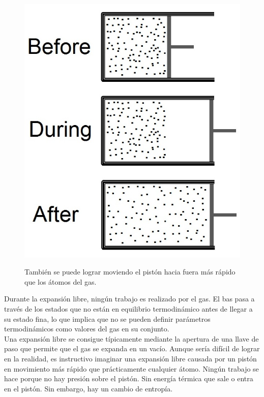 	\begin{figure}[H]
		\centering
		\includegraphics[scale=0.25]{./img/expansionJoule.jpg}
		\label{expansionJoule}
		\caption{También se puede lograr moviendo el pistón hacia fuera más rápido que los átomos del gas.}
	\end{figure}
	
Durante la expansión libre, ningún trabajo es realizado por el gas. El bas pasa a través de los estados que no están en equilibrio termodinámico antes de llegar a su estado fina, lo que implica que no se pueden definir parámetros termodinámicos como valores del gas en su conjunto. \\

Una expansión libre se consigue típicamente mediante la apertura de una llave de paso que permite que el gas se expanda en un vacío. Aunque sería difícil de lograr en la realidad, es instructivo imaginar una expansión libre causada por un pistón en movimiento más rápido que prácticamente cualquier átomo. Ningún trabajo se hace porque no hay presión sobre el pistón. Sin energía térmica que sale o entra en el pistón. Sin embargo, hay un cambio de entropía.

